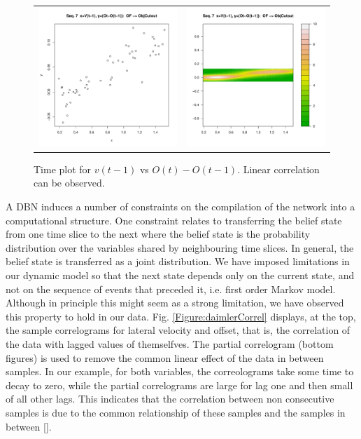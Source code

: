 \begin{figure}
  \centering
  \setlength{\tabcolsep}{0.05pt}
  \renewcommand{\arraystretch}{0.02}
    \begin{tabular}{cc}
    \includegraphics[width=60mm]{figures/DaimlerOBJplotSerie7.pdf}&
    \includegraphics[width=60mm]{figures/DaimlerOBJcontourSerie7.pdf}\\
  \end{tabular}
      \caption{ \label{Figure:daimlerVvsOffs}Time plot for $v(t-1)$ vs $O(t) - O(t-1)$. Linear correlation can be observed.}
\end{figure}

A DBN induces a number of constraints on the compilation of the network into a computational structure. One constraint relates to transferring the belief state from one time slice to the next where the belief state is the probability distribution over the variables shared by neighbouring time slices. In general, the belief state is transferred as a joint distribution. We have imposed limitations in our dynamic model so that the next state depends only on the current state, and not on the sequence of events that preceded it, i.e. first order Markov model. Although in principle this might seem as a strong limitation, we have observed this property to hold in our data. Fig. \ref{Figure:daimlerCorrel} displays, at the top, the sample correlograms for lateral velocity and offset, that is, the correlation of the data with lagged values of themselfves. The partial correlogram (bottom figures) is used to remove the common linear effect of the data in between samples. In our example, for both variables, the correolograms take some time to decay to zero, while the partial correlograms are large for lag one and then small of all other lags. This indicates that the correlation between non consecutive samples is due to the common relationship of these samples and the samples in between [].

